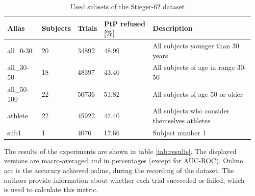 \documentclass[english, he, bc, kiv, iso690alph, viewonly]{fasthesis}
\begin{document}
\begin{table}
	\label{tab:subsets}
	\centering
	\caption{Used subsets of the Stieger-62 dataset}
	\begin{tabular}{*{4}{l}p{}}
		\toprule
		\textbf{Alias} & \textbf{Subjects} & \textbf{Trials} & \textbf{PtP refused [\%]} & \textbf{Description} \\
		\midrule
		all\_0-30 & 20 & 34892 & 48.99 & All subjects younger than 30 years\\
		all\_30-50 & 18 & 48397 & 43.40 & All subjects of age in range 30-50\\
		all\_50-100 & 22 & 50736 & 51.82 & All subjects of age 50 or older\\
		athlete & 22 & 45922 & 47.40 & All subjects who consider themselves athletes\\
		sub1 & 1 & 4076 & 17.66 & Subject number 1\\
		\bottomrule
	\end{tabular}
\end{table}

The results of the experiments are shown in table \ref{tab:results}. The displayed versions are macro-averaged and in percentages (except for AUC-ROC). Online acc is the accuracy achieved online, during the recording of the dataset. The authors provide information about whether each trial succeeded or failed, which is used to calculate this metric.

\begin{table}
	\label{tab:results}
	\centering
	\caption{Model results}
\end{table}
\end{document}
